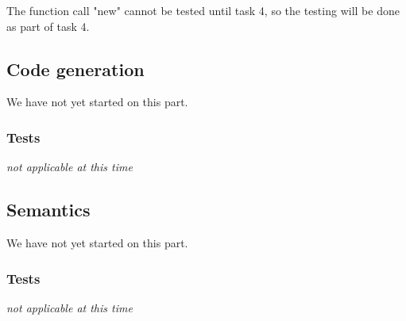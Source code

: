 \documentclass[11pt]{article}
\begin{document}
The function call "new" cannot be tested until task 4, so the testing will be done as part of task 4.

\subsection{Code generation}
We have not yet started on this part.

\subsubsection{Tests}%
{\it not applicable at this time}%

\subsection{Semantics}
We have not yet started on this part.

\subsubsection{Tests}
{\it not applicable at this time}%
\end{document}

